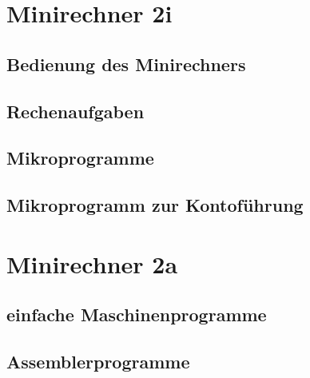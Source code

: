 \documentclass[paper=a4, fontsize=11pt]{scrartcl}
\numberwithin{equation}{section}
\numberwithin{figure}{section}
\numberwithin{table}{section}
\begin{document}

\newpage

\section{Minirechner 2i}

\subsection{Bedienung des Minirechners}

\subsection{Rechenaufgaben}

\subsection{Mikroprogramme}

\subsection{Mikroprogramm zur Kontoführung}


\newpage

\section{Minirechner 2a}

\subsection{einfache Maschinenprogramme}

\subsection{Assemblerprogramme}
\end{document}
